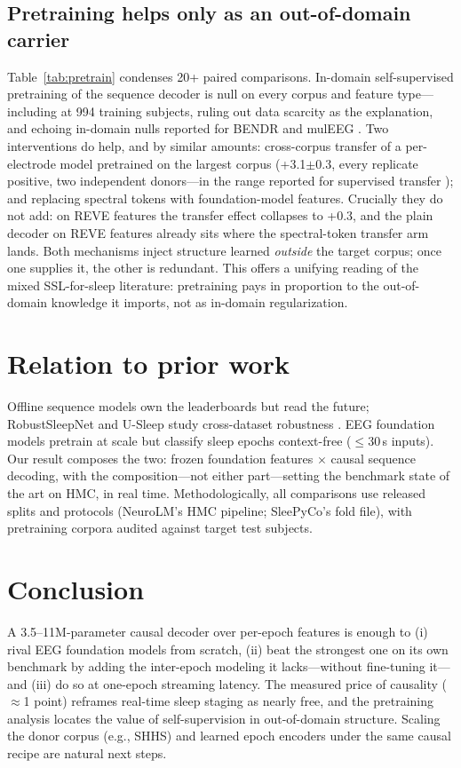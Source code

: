 \documentclass[conference,10pt]{IEEEtran}
\begin{document}
\subsection{Pretraining helps only as an out-of-domain carrier}
Table~\ref{tab:pretrain} condenses 20+ paired comparisons. In-domain self-supervised pretraining of the sequence decoder is null on every corpus and feature type---including at 994 training subjects, ruling out data scarcity as the explanation, and echoing in-domain nulls reported for BENDR and mulEEG \cite{bendr,muleeg}. Two interventions do help, and by similar amounts: cross-corpus transfer of a per-electrode model pretrained on the largest corpus (+3.1$\pm$0.3, every replicate positive, two independent donors---in the range reported for supervised transfer \cite{sleeptransformer,phan2020transfer}); and replacing spectral tokens with foundation-model features. Crucially they do not add: on REVE features the transfer effect collapses to +0.3, and the plain decoder on REVE features already sits where the spectral-token transfer arm lands. Both mechanisms inject structure learned \emph{outside} the target corpus; once one supplies it, the other is redundant. This offers a unifying reading of the mixed SSL-for-sleep literature: pretraining pays in proportion to the out-of-domain knowledge it imports, not as in-domain regularization.

\section{Relation to prior work}
Offline sequence models \cite{seqsleepnet,xsleepnet,sleeptransformer,sleepyco,utime} own the leaderboards but read the future; RobustSleepNet and U-Sleep study cross-dataset robustness \cite{robustsleepnet,usleep}. EEG foundation models \cite{biot,labram,eegpt,cbramod,neurolm,reve} pretrain at scale but classify sleep epochs context-free ($\leq$30\,s inputs). Our result composes the two: frozen foundation features $\times$ causal sequence decoding, with the composition---not either part---setting the benchmark state of the art on HMC, in real time. Methodologically, all comparisons use released splits and protocols (NeuroLM's HMC pipeline; SleePyCo's fold file), with pretraining corpora audited against target test subjects.

\section{Conclusion}
A 3.5--11M-parameter causal decoder over per-epoch features is enough to (i) rival EEG foundation models from scratch, (ii) beat the strongest one on its own benchmark by adding the inter-epoch modeling it lacks---without fine-tuning it---and (iii) do so at one-epoch streaming latency. The measured price of causality ($\approx$1 point) reframes real-time sleep staging as nearly free, and the pretraining analysis locates the value of self-supervision in out-of-domain structure. Scaling the donor corpus (e.g., SHHS) and learned epoch encoders under the same causal recipe are natural next steps.



\end{document}

